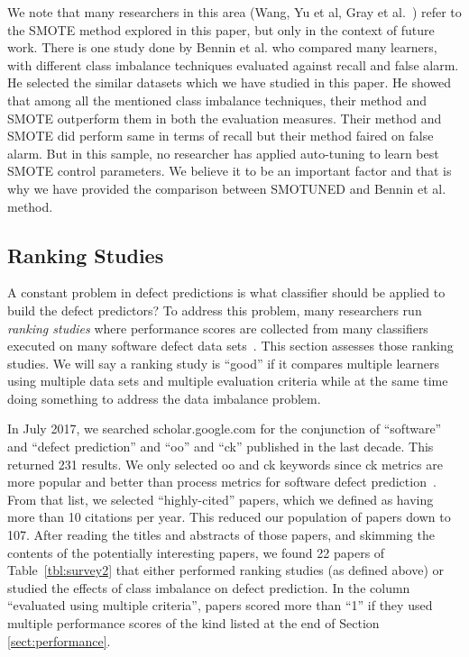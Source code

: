 \documentclass[sigconf,review, anonymous]{acmart}
\theoremstyle{break}
\theoremstyle{break}
\newcommand{\tion}[1]{{Section }\ref{sect:#1}}
\newcommand{\sma}{{\sc SMOTE}}
\newcommand{\smb}{{\sc SMOTUNED}}
\begin{document}
We note that  
many researchers in this area  (Wang, Yu et al, Gray et al.~\cite{gray2009using,yuperformance,wang2013using}) refer to the {\sma} method explored in this paper,  but only in the context of future work. 
There is one study done by Bennin et al.\cite{bennin2017mahakil} who compared many learners, with different class imbalance techniques evaluated against recall and false alarm. He selected the similar datasets which we have studied in this paper. He showed that among all the mentioned class imbalance techniques, their method and {\sma} outperform them in both the evaluation measures. Their method and {\sma} did perform same in terms of recall but their method faired on false alarm. But in this sample, no researcher has  applied auto-tuning to learn best {\sma} control parameters. We believe it to be an important factor and that is why we have provided the comparison between {\smb} and Bennin et al. method.
 

\subsection{Ranking Studies}
\label{sect:rank}

A constant problem in defect predictions is what  classifier should be applied to  build  the  defect  predictors?
To address this problem, many researchers run {\em ranking studies} where  performance scores 
are collected from  many classifiers  executed on  many software defect data sets~\cite{lessmann2008benchmarking,hall2012systematic,elish2008predicting,menzies2010defect,gondra2008applying,radjenovic2013software,jiang2008techniques,wang2013using,mende2009revisiting,li2012sample,khoshgoftaar2010attribute,jiang2009variance,ghotra2015revisiting,jiang2008can,tantithamthavorn2016automated,fu2016tuning}.
This section assesses those ranking studies. We will say a ranking study is ``good'' if it compares multiple learners using multiple data sets and multiple evaluation criteria
while at the same time doing something to address the data imbalance problem.

 In July 2017,  we searched
scholar.google.com for the conjunction of ``software'' and ``defect prediction'' and ``oo'' and ``ck'' published in the last decade. This returned 231 results.
We only selected oo and ck keywords since ck metrics are more popular and better than process metrics for software defect prediction~\cite{radjenovic2013software}.
From that list, we selected ``highly-cited'' papers, which we defined as having more than 10 citations per year. This reduced our population of papers down to 107.
After reading the titles and abstracts of those papers, and skimming the contents of the potentially interesting papers, we found 22 papers of Table~\ref{tbl:survey2} that either performed ranking studies
(as defined above) or studied the effects of class imbalance on defect prediction. In the column ``evaluated using
multiple criteria'',
papers scored more than ``1'' if they used multiple performance scores  of the kind listed at the end of \tion{performance}. 
\end{document}
